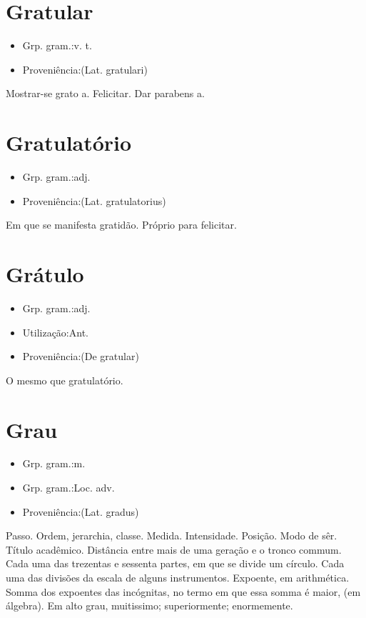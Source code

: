 \section{Gratular}
\begin{itemize}
\item {Grp. gram.:v. t.}
\end{itemize}
\begin{itemize}
\item {Proveniência:(Lat. \textunderscore gratulari\textunderscore )}
\end{itemize}
Mostrar-se grato a.
Felicitar.
Dar parabens a.
\section{Gratulatório}
\begin{itemize}
\item {Grp. gram.:adj.}
\end{itemize}
\begin{itemize}
\item {Proveniência:(Lat. \textunderscore gratulatorius\textunderscore )}
\end{itemize}
Em que se manifesta gratidão.
Próprio para felicitar.
\section{Grátulo}
\begin{itemize}
\item {Grp. gram.:adj.}
\end{itemize}
\begin{itemize}
\item {Utilização:Ant.}
\end{itemize}
\begin{itemize}
\item {Proveniência:(De \textunderscore gratular\textunderscore )}
\end{itemize}
O mesmo que \textunderscore gratulatório\textunderscore .
\section{Grau}
\begin{itemize}
\item {Grp. gram.:m.}
\end{itemize}
\begin{itemize}
\item {Grp. gram.:Loc. adv.}
\end{itemize}
\begin{itemize}
\item {Proveniência:(Lat. \textunderscore gradus\textunderscore )}
\end{itemize}
Passo.
Ordem, jerarchia, classe.
Medida.
Intensidade.
Posição.
Modo de sêr.
Título acadêmico.
Distância entre mais de uma geração e o tronco commum.
Cada uma das trezentas e sessenta partes, em que se divide um círculo.
Cada uma das divisões da escala de alguns instrumentos.
Expoente, em arithmética.
Somma dos expoentes das incógnitas, no termo em que essa somma é maior, (em álgebra).
\textunderscore Em alto grau\textunderscore , muitissimo; superiormente; enormemente.
